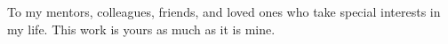To my mentors, colleagues, friends, and loved ones who take special interests in my life. This work is yours as much as it is mine.